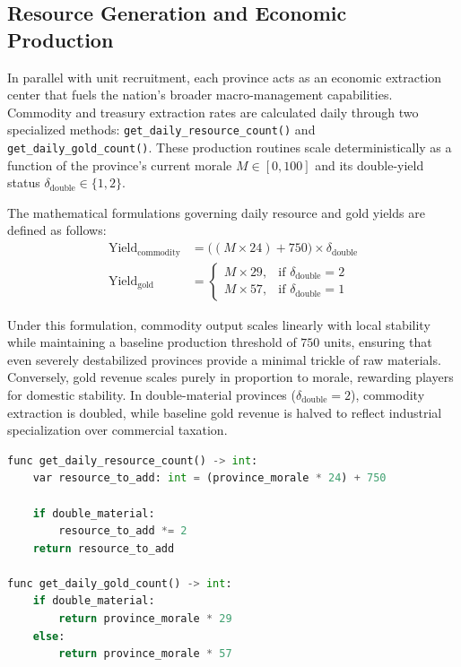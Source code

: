 \subsection{Resource Generation and Economic Production}
\label{subsec:resource_generation}

In parallel with unit recruitment, each province acts as an economic extraction center that fuels the nation's broader macro-management capabilities. Commodity and treasury extraction rates are calculated daily through two specialized methods: \texttt{get\_daily\_resource\_count()} and \texttt{get\_daily\_gold\_count()}. These production routines scale deterministically as a function of the province's current morale $M \in [0, 100]$ and its double-yield status $\delta_{\text{double}} \in \{1, 2\}$.

The mathematical formulations governing daily resource and gold yields are defined as follows:
\begin{align}
    \text{Yield}_{\text{commodity}} &= \big((M \times 24) + 750\big) \times \delta_{\text{double}} \\
    \text{Yield}_{\text{gold}} &= \begin{cases} 
        M \times 29, & \text{if } \delta_{\text{double}} = 2 \\ 
        M \times 57, & \text{if } \delta_{\text{double}} = 1 
    \end{cases}
\end{align}

Under this formulation, commodity output scales linearly with local stability while maintaining a baseline production threshold of $750$ units, ensuring that even severely destabilized provinces provide a minimal trickle of raw materials. Conversely, gold revenue scales purely in proportion to morale, rewarding players for domestic stability. In double-material provinces ($\delta_{\text{double}} = 2$), commodity extraction is doubled, while baseline gold revenue is halved to reflect industrial specialization over commercial taxation.

\begin{lstlisting}[language=python, caption={Resource and treasury daily extraction functions in GDScript.}, label={lst:resource_generation}]
func get_daily_resource_count() -> int:
    var resource_to_add: int = (province_morale * 24) + 750

    if double_material:
        resource_to_add *= 2
    return resource_to_add

func get_daily_gold_count() -> int:
    if double_material:
        return province_morale * 29
    else:
        return province_morale * 57
\end{lstlisting}

